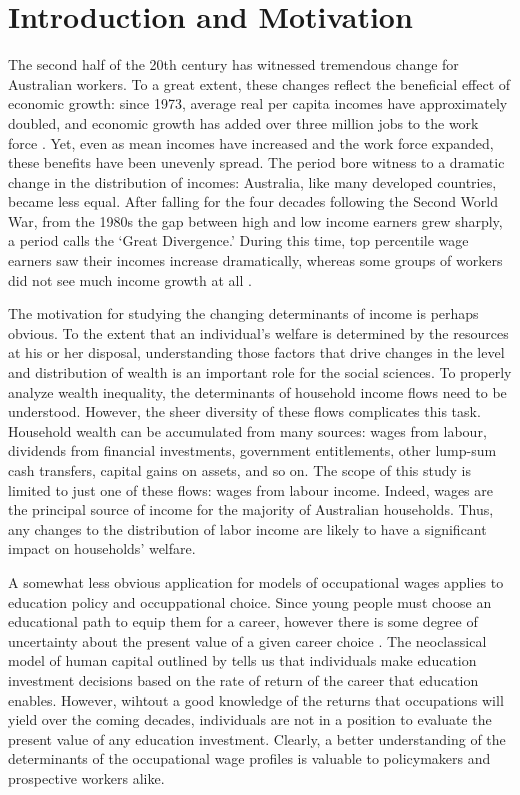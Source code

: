 \chapter{Introduction and Motivation}

The second half of the 20th century has witnessed tremendous change for Australian workers. To a great extent, these changes reflect the beneficial effect of economic growth: since 1973, average real per capita incomes have approximately doubled, and economic growth has added over three million jobs to the work force \citep{ABS5206,LFSApr2013}. Yet, even as mean incomes have increased and the work force expanded, these benefits have been unevenly spread. The period bore witness to a dramatic change in the distribution of incomes: Australia, like many developed countries, became less equal. After falling for the four decades following the Second World War, from the 1980s the gap between high and low income earners grew sharply, a period \citet{Leigh2013} calls the `Great Divergence.' During this time, top percentile wage earners saw their incomes increase dramatically, whereas some groups of workers did not see much income growth at all \citep{Atkinson1997,Borland1999,Leigh2013}.

The motivation for studying the changing determinants of income is perhaps obvious. To the extent that an individual's welfare is determined by the resources at his or her disposal, understanding those factors that drive changes in the level and distribution of wealth is an important role for the social sciences. To properly analyze wealth inequality, the determinants of household income flows need to be understood. However, the sheer diversity of these flows complicates this task. Household wealth can be accumulated from many sources: wages from labour, dividends from financial investments, government entitlements, other lump-sum cash transfers, capital gains on assets, and so on. The scope of this study is limited to just one of these flows: wages from labour income. Indeed, wages are the principal source of income for the majority of Australian households. Thus, any changes to the distribution of labor income are likely to have a significant impact on households' welfare. 

A somewhat less obvious application for models of occupational wages applies to education policy and occuppational choice. Since young people must choose an educational path to equip them for a career, however there is some degree of uncertainty about the present value of a given career choice \citep[see e.g.][ch. 12]{Dixit1994}. The neoclassical model of human capital outlined by \citet{Becker2009} tells us that individuals make education investment decisions based on the rate of return of the career that education enables. However, wihtout a good knowledge of the returns that occupations will yield over the coming decades, individuals are not in a position to evaluate the present value of any education investment. Clearly, a better understanding of the determinants of the occupational wage profiles is valuable to policymakers and prospective workers alike.

